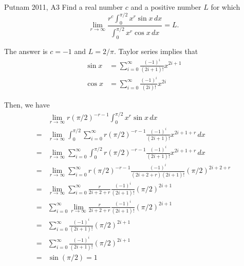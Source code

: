 
\begin{prob}{Putnam 2011, A3}{}
        Find a real number $c$ and a positive number $L$ for which
        \[\lim_{r\to\infty}\frac{r^c\int_0^{\pi/2}x^r\sin x\,dx}{\int_0^{\pi/2}x^r\cos x\,dx}=L.\]
\end{prob}

\begin{sol}{}{}
	The answer is \(c = -1\) and \(L = 2/\pi\).
	Taylor series implies that 
	\begin{align*}
		\sin x  &= \sum_{i=0}^\infty \frac{(-1)^i}{(2i+1)!} x^{2i+1} \\
		\cos x  &= \sum_{i=0}^\infty \frac{(-1)^i}{(2i)!} x^{2i}
	\end{align*}

	Then, we have 
	\begin{align*}
		&\lim_{r\to \infty}
		{r(\pi/2)^{-r-1} \int_0^{\pi/2} x^r \sin x\,dx} \\
		=& \lim_{r\to \infty}
		{\int_0^{\pi/2} \sum_{i=0}^\infty r(\pi/2)^{-r-1}\frac{(-1)^i}{(2i+1)!} x^{2i+1+r}\,dx} \\
		=& \lim_{r\to \infty}
		{\sum_{i=0}^\infty \int_0^{\pi/2} r(\pi/2)^{-r-1}\frac{(-1)^i}{(2i+1)!} x^{2i+1+r}\,dx} \\
		=& \lim_{r\to \infty}
		{\sum_{i=0}^\infty r(\pi/2)^{-r-1}\frac{(-1)^i}{(2i+2+r)(2i+1)!} \left(\pi/2\right)^{2i+2+r}} \\
		=& \lim_{r\to \infty}
		{\sum_{i=0}^\infty \frac{r}{2i+2+r}\frac{(-1)^i}{(2i+1)!} \left(\pi/2\right)^{2i+1}} \\
		=& \sum_{i=0}^\infty \lim_{r\to \infty}
		{\frac{r}{2i+2+r}\frac{(-1)^i}{(2i+1)!} \left(\pi/2\right)^{2i+1}} \\
		=& \sum_{i=0}^\infty
		{\frac{(-1)^i}{(2i+1)!} \left(\pi/2\right)^{2i+1}} \\
		=& \sum_{i=0}^\infty
		{\frac{(-1)^i}{(2i+1)!} \left(\pi/2\right)^{2i+1}} \\
		=& \sin\left(\pi/2\right) = 1
	\end{align*}


\end{sol}

